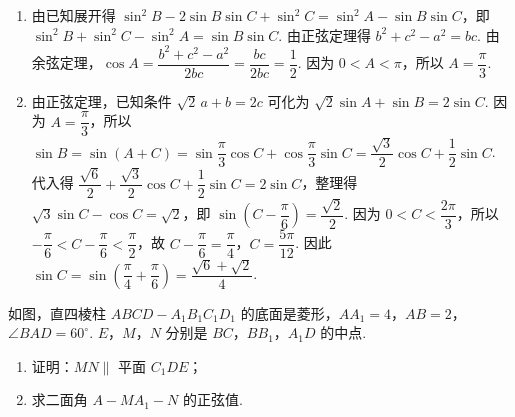 \begin{solution}
\begin{enumerate}
\item 由已知展开得 \(\sin^2B-2\sin B\sin C+\sin^2C=\sin^2A-\sin B\sin C\)，即 \(\sin^2B+\sin^2C-\sin^2A=\sin B\sin C\). 由正弦定理得 \(b^2+c^2-a^2=bc\). 由余弦定理，\(\cos A=\dfrac{b^2+c^2-a^2}{2bc}=\dfrac{bc}{2bc}=\dfrac12\). 因为 \(0<A<\pi\)，所以 \(A=\dfrac\pi3\).
\item 由正弦定理，已知条件 \(\sqrt2\,a+b=2c\) 可化为 \(\sqrt2\sin A+\sin B=2\sin C\). 因为 \(A=\dfrac\pi3\)，所以 \(\sin B=\sin(A+C)=\sin\dfrac\pi3\cos C+\cos\dfrac\pi3\sin C=\dfrac{\sqrt3}{2}\cos C+\dfrac12\sin C\). 代入得 \(\dfrac{\sqrt6}{2}+\dfrac{\sqrt3}{2}\cos C+\dfrac12\sin C=2\sin C\)，整理得 \(\sqrt3\sin C-\cos C=\sqrt2\)，即 \(\sin\left(C-\dfrac\pi6\right)=\dfrac{\sqrt2}{2}\). 因为 \(0<C<\dfrac{2\pi}{3}\)，所以 \(-\dfrac\pi6<C-\dfrac\pi6<\dfrac\pi2\)，故 \(C-\dfrac\pi6=\dfrac\pi4\)，\(C=\dfrac{5\pi}{12}\). 因此 \(\sin C=\sin\left(\dfrac\pi4+\dfrac\pi6\right)=\dfrac{\sqrt6+\sqrt2}{4}\).
\end{enumerate}
\end{solution}

\begin{problem}
如图，直四棱柱 \(ABCD-A_1B_1C_1D_1\) 的底面是菱形，\(AA_1=4\)，\(AB=2\)，\(\angle BAD=60^\circ\). \(E\)，\(M\)，\(N\) 分别是 \(BC\)，\(BB_1\)，\(A_1D\) 的中点.

\begin{enumerate}
\item 证明：\(MN\parallel\) 平面 \(C_1DE\)；

\item 求二面角 \(A-MA_1-N\) 的正弦值.

\end{enumerate}
\end{problem}

